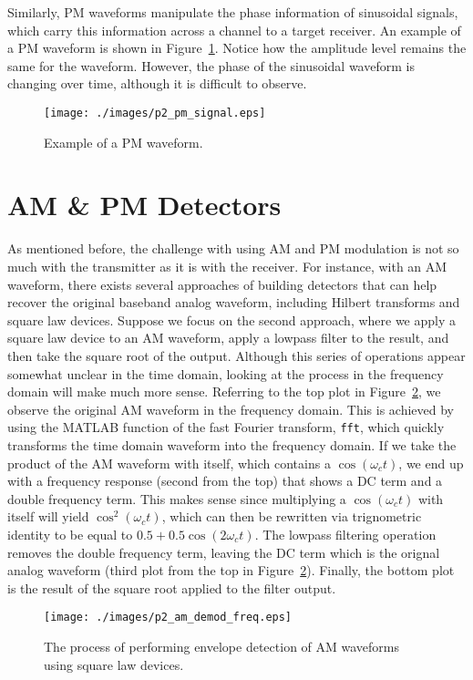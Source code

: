 \documentclass[letterpaper,12pt]{article}
\begin{document}
Similarly, PM waveforms manipulate the phase information of sinusoidal signals, which carry this information across a channel to a target receiver.  An example of a PM waveform is shown in Figure~\ref{f:p2_pm}.  Notice how the 
amplitude level remains the same for the waveform.  However, the phase of the sinusoidal waveform is changing over time, although it is difficult to observe.


\begin{figure}[h]
 \centering
 \texttt{[image: ./images/p2\_pm\_signal.eps]}
 \caption{Example of a PM waveform.}\label{f:p2_pm}
\end{figure}

\section{AM \& PM Detectors}\label{s:ampm}

As mentioned before, the challenge with using AM and PM modulation is not so much with the transmitter as it is with the receiver. For instance, with an AM waveform, there exists several approaches of building
detectors that can help recover the original baseband analog waveform, including Hilbert transforms and square law devices.  Suppose we focus on the second approach, where we apply a square law device to an AM waveform, apply
a lowpass filter to the result, and then take the square root of the output.  Although this series of operations appear somewhat unclear in the time domain, looking at the process in the frequency domain will make much more sense.  
Referring to the top plot in Figure~\ref{f:p2_am_demod_freq}, we observe the original AM waveform in the frequency domain.  This is achieved by using the MATLAB function of the fast Fourier transform, \texttt{fft}, which 
quickly transforms the time domain waveform into the frequency domain.  If we take the product of the AM waveform with itself, which contains a $\cos(\omega_ct)$, we end up with a frequency response (second from the top) 
that shows a DC term and a double frequency term.  This makes sense since multiplying a $\cos(\omega_ct)$ with itself will yield $\cos^2(\omega_ct)$, which can then be rewritten via trignometric identity to be equal to
$0.5+0.5\cos(2\omega_ct)$.  The lowpass filtering operation removes the double frequency term, leaving the DC term which is the orignal analog waveform (third plot from the top in Figure~\ref{f:p2_am_demod_freq}).  Finally, the bottom plot
is the result of the square root applied to the filter output.
\begin{figure}[h]
 \centering
 \texttt{[image: ./images/p2\_am\_demod\_freq.eps]}
 \caption{The process of performing envelope detection of AM waveforms using square law devices.}\label{f:p2_am_demod_freq}
\end{figure}
\end{document}
